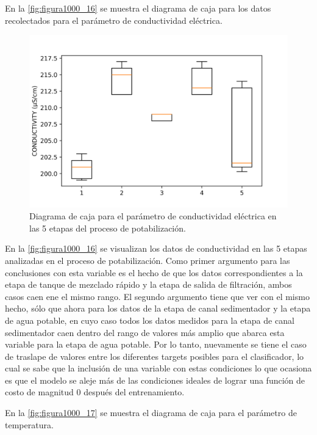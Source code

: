 En la \autoref{fig:figura1000_16} se muestra el diagrama de caja para los datos recolectados para el parámetro de conductividad eléctrica.

\begin{figure}[h]
	\centering
	\includegraphics[scale=1.0]{imgss166.png}
	\caption{Diagrama de caja para el parámetro de conductividad eléctrica en las 5 etapas del proceso de potabilización.}
	\label{fig:figura1000_16}
\end{figure}

En la \autoref{fig:figura1000_16} se visualizan los datos de conductividad en las 5 etapas analizadas en el proceso de potabilización. Como primer argumento para las conclusiones con esta variable es el hecho de que los 
datos correspondientes a la etapa de tanque de mezclado rápido y la etapa de salida de filtración, ambos casos caen ene el mismo rango. El segundo argumento tiene que ver con el mismo hecho, sólo que ahora para los datos 
de la etapa de canal sedimentador y la etapa de agua potable, en cuyo caso todos los datos medidos para la etapa de canal sedimentador caen dentro del rango de valores más amplio que abarca esta variable para la etapa de 
agua potable. Por lo tanto, nuevamente se tiene el caso de traslape de valores entre los diferentes targets posibles para el clasificador, lo cual se sabe que la inclusión de una variable con estas condiciones lo que ocasiona 
es que el modelo se aleje más de las condiciones ideales de lograr una función de costo de magnitud 0 después del entrenamiento.

En la \autoref{fig:figura1000_17} se muestra el diagrama de caja para el parámetro de temperatura.

